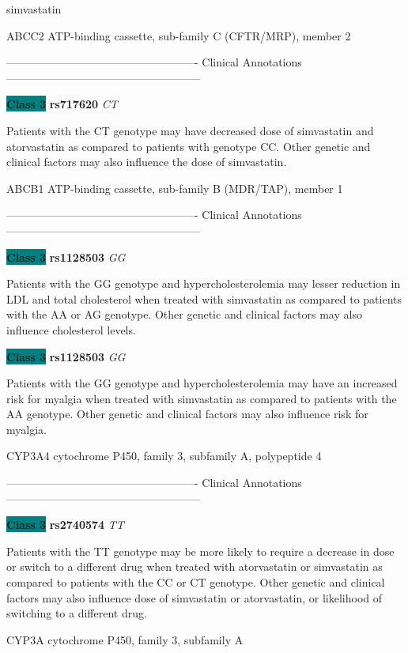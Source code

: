 \documentclass{resume} %
\begin{document}
\begin{rSection}{ simvastatin }
\begin{rSubsection}{ ABCC2 }{ ATP-binding cassette, sub-family C (CFTR/MRP), member 2 }{}{}
\item[] ---------------------------------------------------- Clinical Annotations -----------------------------------------------------\newline
\item \textbf{\colorbox{teal} {Class 3}} \textbf{ rs717620 } \textit{ CT }
\item[] Patients with the CT genotype may have decreased dose of simvastatin and atorvastatin as compared to patients with genotype CC. Other genetic and clinical factors may also influence the dose of simvastatin.
\end{rSubsection}\begin{rSubsection}{ ABCB1 }{ ATP-binding cassette, sub-family B (MDR/TAP), member 1 }{}{}
\item[]

\item[] ---------------------------------------------------- Clinical Annotations -----------------------------------------------------\newline
\item \textbf{\colorbox{teal} {Class 3}} \textbf{ rs1128503 } \textit{ GG }
\item[] Patients with the GG genotype and hypercholesterolemia may lesser reduction in LDL and total cholesterol when treated with simvastatin as compared to patients with the AA or AG genotype. Other genetic and clinical factors may also influence cholesterol levels.\item \textbf{\colorbox{teal} {Class 3}} \textbf{ rs1128503 } \textit{ GG }
\item[] Patients with the GG genotype and hypercholesterolemia may have an increased risk for myalgia when treated with simvastatin as compared to patients with the AA genotype. Other genetic and clinical factors may also influence risk for myalgia.
\end{rSubsection}\begin{rSubsection}{ CYP3A4 }{ cytochrome P450, family 3, subfamily A, polypeptide 4 }{}{}
\item[]

\item[] ---------------------------------------------------- Clinical Annotations -----------------------------------------------------\newline
\item \textbf{\colorbox{teal} {Class 3}} \textbf{ rs2740574 } \textit{ TT }
\item[] Patients with the TT genotype may be more likely to require a decrease in dose or switch to a different drug when treated with atorvastatin or simvastatin as compared to patients with the CC or CT genotype. Other genetic and clinical factors may also influence dose of simvastatin or atorvastatin, or likelihood of switching to a different drug.
\end{rSubsection}\begin{rSubsection}{ CYP3A }{ cytochrome P450, family 3, subfamily A }{}{}
\item[]


\end{rSubsection}
\end{rSection}
\end{document}
